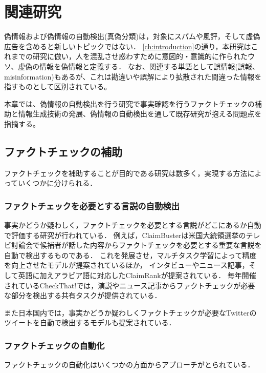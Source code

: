 \chapter{関連研究}\label{ch:rel_res}

偽情報および偽情報の自動検出(真偽分類)は，対象にスパム\cite{shen2017discovering}や風評\cite{7023340}，そして虚偽広告\cite{Huang:2017:DFO:3041021.3054233}を含めると新しいトピックではない．
\cref{ch:introduction}の通り，本研究はこれまでの研究\cite{Born2017-11-02,Shu:2017:FND:3137597.3137600,Ruchansky:2017:CHD:3132847.3132877,Wang:2018:EEA:3219819.3219903}に倣い，人を混乱させ惑わすために意図的・意識的に作られたウソ、虚偽の情報を偽情報と定義する．
なお、関連する単語として誤情報(誤報、misinformation)もあるが、これは勘違いや誤解により拡散された間違った情報を指すものとして区別されている\cite{Born2017-11-02,gov2024}。

本章では、偽情報の自動検出を行う研究で事実確認を行うファクトチェックの補助と情報生成技術の発展、偽情報の自動検出を通して既存研究が抱える問題点を指摘する。


\section{ファクトチェックの補助}
ファクトチェックを補助することが目的である研究は数多く，実現する方法によっていくつかに分けられる．

\subsection{ファクトチェックを必要とする言説の自動検出}
事実かどうか疑わしく，ファクトチェックを必要とする言説がどこにあるか自動で評価する研究が行われている．
例えば，ClaimBusterは米国大統領選挙のテレビ討論会で候補者が話した内容からファクトチェックを必要とする重要な言説を自動で検出するものである\cite{10.1145/2806416.2806652}．
これを発展させ，マルチタスク学習によって精度を向上させたモデル\cite{vasileva-etal-2019-takes}が提案されているほか，
インタビューやニュース記事，そして英語に加えアラビア語に対応したClaimRank\cite{jaradat-etal-2018-claimrank}が提案されている．
毎年開催されているCheckThat!では，演説やニュース記事からファクトチェックが必要な部分を検出する共有タスクが提供されている\cite{10.1007/978-3-030-45442-5_65}．

また日本国内では，事実かどうか疑わしくファクトチェックが必要なTwitterのツイートを自動で検出するモデルも提案されている\cite{内山香2018}．

\subsection{ファクトチェックの自動化}
ファクトチェックの自動化はいくつかの方面からアプローチがとられている．

